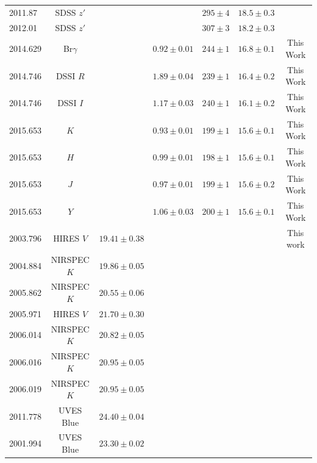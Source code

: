 \begin{landscape}
\begin{table}[hbt!]
\begin{center}
\begin{tabular}{lcccccc}
2011.87  & SDSS $z'$        &  &                 & $295  \pm 4$   & $18.5  \pm 0.3$   & \citet{Janson14a} \\
2012.01  & SDSS $z'$        &  &                 & $307  \pm 3$   & $18.2  \pm 0.3$   & \citet{Janson14a} \\
2014.629 & Br$\gamma$    &     & $0.92 \pm 0.01$ & $244  \pm 1$   & $16.8 \pm 0.1$    & This Work \\
2014.746 & DSSI $R$       &    & $1.89 \pm 0.04$ & $239\pm 1$ & $16.4 \pm 0.2$  & This Work \\
2014.746 & DSSI $I$        &   & $1.17 \pm 0.03$ &    $240 \pm 1$       &     $16.1 \pm 0.2$           & This Work\\
2015.653 & $K$               &    &  $0.93 \pm 0.01$ &    $199 \pm 1$      &   $15.6 \pm 0.1$     & This Work \\
2015.653 & $H$               &    &  $0.99 \pm 0.01$ &   $198 \pm 1$    &  $15.6 \pm 0.1$        & This Work \\
2015.653 & $J$               &    &  $0.97 \pm 0.01$ &    $199 \pm 1$   &  $15.6 \pm 0.2$      & This Work \\
2015.653 & $Y$               &    &  $1.06 \pm 0.03$ &   $200 \pm 1$    &  $15.6 \pm 0.1$      & This Work \\
\hline
2003.796   & HIRES $V$   & $ 19.41 \pm 0.38 $ &        &         &          & This work \\
2004.884 & NIRSPEC $K$ &  $19.86 \pm 0.05$         &        &       &         &  \citet{Bailey12} \\
2005.862 & NIRSPEC $K$ &  $20.55 \pm 0.06$         &        &       &         &  \citet{Bailey12} \\
2005.971 & HIRES $V$ &      $21.70 \pm 0.30$     &        &       &         &  \citet{Shkolnik12} \\
2006.014 & NIRSPEC $K$ &  $20.82 \pm 0.05$         &        &       &         &  \citet{Bailey12} \\
2006.016 & NIRSPEC $K$ &  $20.95 \pm 0.05$         &        &       &         &  \citet{Bailey12} \\
2006.019 & NIRSPEC $K$ &  $20.95 \pm 0.05$         &        &       &         &  \citet{Bailey12} \\
2011.778 & UVES Blue &        $24.40 \pm 0.04$   &        &       &         &  \citet{Elliott14} \\
2001.994 & UVES Blue &        $23.30 \pm 0.02$   &        &       &         &  \citet{Elliott14} \\

\end{tabular}
\end{center}
\end{table}
\end{landscape}

